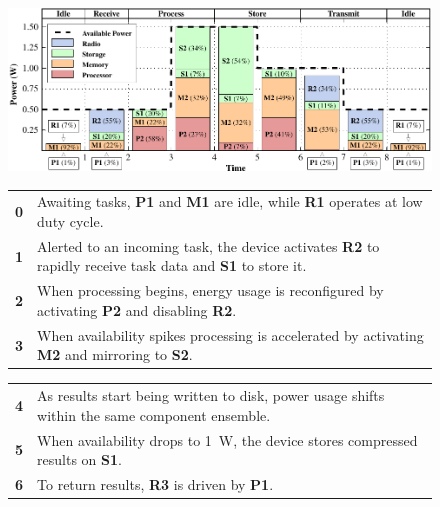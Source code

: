 \begin{figure}[t]
\includegraphics{./figures/transitiongraph.pdf}
\noindent\begin{minipage}[t]{0.5\textwidth}
\vspace{-0.05in}
\begin{tabularx}{\columnwidth}{cX}

\textbf{0} & Awaiting tasks, \textbf{P1} and \textbf{M1} are idle, while
\textbf{R1} operates at low duty cycle.
\\

\textbf{1} & 
Alerted to an incoming task, the device activates \textbf{R2} to rapidly
receive task data and \textbf{S1} to store it.
\\

\textbf{2} &
When processing begins, energy usage is reconfigured by activating
\textbf{P2} and disabling \textbf{R2}.
\\

\textbf{3} &
When availability spikes processing is accelerated by activating \textbf{M2}
and mirroring to \textbf{S2}.
\\

\end{tabularx}

\end{minipage}
\begin{minipage}[t]{0.5\textwidth}
\vspace{-0.05in}

\begin{tabularx}{\columnwidth}{cX}

\textbf{4} &
As results start being written to disk, power usage shifts within the same
component ensemble.
\\

\textbf{5} & 
When availability drops to 1~W, the device stores compressed results on
\textbf{S1}.
\\

\textbf{6} &
To return results, \textbf{R3} is driven by \textbf{P1}.
\\


\end{tabularx}
\end{minipage}
\end{figure}
